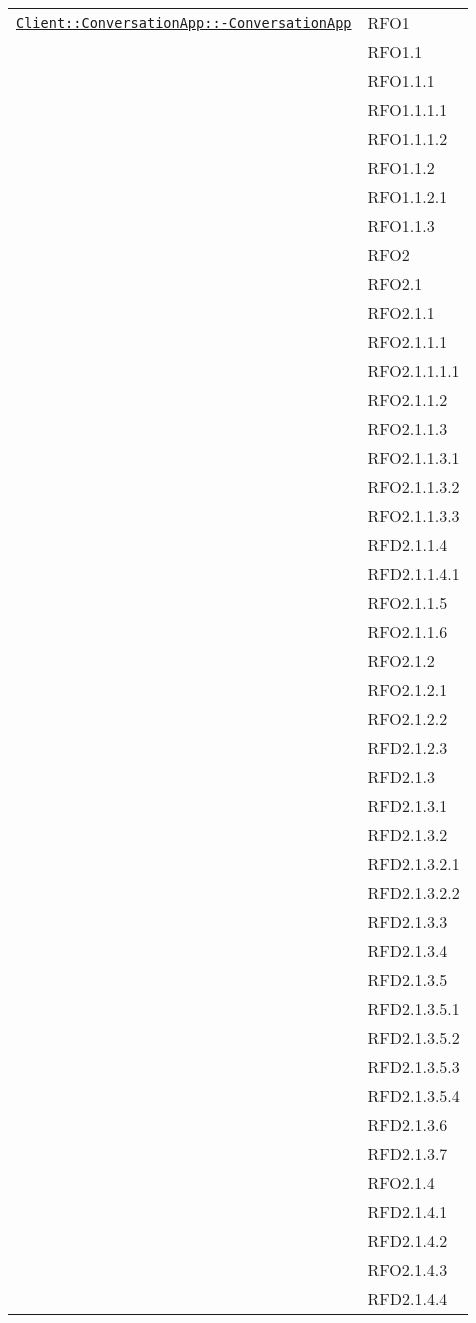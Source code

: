 \begin{longtable}{|>{\centering}m{10cm}|m{3cm}<{\centering}|}
\hyperref[Client::ConversationApp::ConversationApp]{\texttt{Client::ConversationApp::-\linebreak ConversationApp}} & RFO1\\
& RFO1.1\\
& RFO1.1.1\\
& RFO1.1.1.1\\
& RFO1.1.1.2\\
& RFO1.1.2\\
& RFO1.1.2.1\\
& RFO1.1.3\\
& RFO2\\
& RFO2.1\\
& RFO2.1.1\\
& RFO2.1.1.1\\
& RFO2.1.1.1.1\\
& RFO2.1.1.2\\
& RFO2.1.1.3\\
& RFO2.1.1.3.1\\
& RFO2.1.1.3.2\\
& RFO2.1.1.3.3\\
& RFD2.1.1.4\\
& RFD2.1.1.4.1\\
& RFO2.1.1.5\\
& RFO2.1.1.6\\
& RFO2.1.2\\
& RFO2.1.2.1\\
& RFO2.1.2.2\\
& RFD2.1.2.3\\
& RFD2.1.3\\
& RFD2.1.3.1\\
& RFD2.1.3.2\\
& RFD2.1.3.2.1\\
& RFD2.1.3.2.2\\
& RFD2.1.3.3\\
& RFD2.1.3.4\\
& RFD2.1.3.5\\
& RFD2.1.3.5.1\\
& RFD2.1.3.5.2\\
& RFD2.1.3.5.3\\
& RFD2.1.3.5.4\\
& RFD2.1.3.6\\
& RFD2.1.3.7\\
& RFO2.1.4\\
& RFD2.1.4.1\\
& RFD2.1.4.2\\
& RFO2.1.4.3\\
& RFD2.1.4.4\\

\end{longtable}
